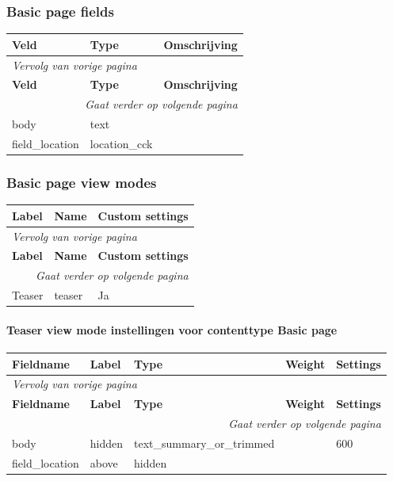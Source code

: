 \subsubsection{Basic page fields}
  \begin{longtable}{| p{5.00cm}|p{5.00cm}|p{5.00cm}|}
  \hline
  \rowcolor{tableheader}
  \textbf{Veld} & \textbf{Type} & \textbf{Omschrijving}  \tabularnewline
  \hline
\endfirsthead
\multicolumn{3}{l}{\textit{Vervolg van vorige pagina}} \\
\hline
\rowcolor{tableheader}
  \textbf{Veld} & \textbf{Type} & \textbf{Omschrijving}  \tabularnewline
  \hline
\hline
\endhead
\multicolumn{3}{r}{\textit{Gaat verder op volgende pagina}} \\
\endfoot
\hline
\endlastfoot
  body & text &   \tabularnewline
  \hline
  field\_location & location\_cck &   \tabularnewline
  \hline
  \end{longtable}

\subsubsection{Basic page view modes}
  \begin{longtable}{| p{5.00cm}|p{5.00cm}|p{5.00cm}|}
  \hline
  \rowcolor{tableheader}
  \textbf{Label} & \textbf{Name} & \textbf{Custom settings}  \tabularnewline
  \hline
\endfirsthead
\multicolumn{3}{l}{\textit{Vervolg van vorige pagina}} \\
\hline
\rowcolor{tableheader}
  \textbf{Label} & \textbf{Name} & \textbf{Custom settings}  \tabularnewline
  \hline
\hline
\endhead
\multicolumn{3}{r}{\textit{Gaat verder op volgende pagina}} \\
\endfoot
\hline
\endlastfoot
  Teaser & teaser & Ja  \tabularnewline
  \hline
  \end{longtable}

\paragraph{Teaser view mode instellingen voor contenttype Basic page }

  \begin{longtable}{| p{3.00cm}|p{3.00cm}|p{3.00cm}|p{3.00cm}|p{3.00cm}|}
  \hline
  \rowcolor{tableheader}
  \textbf{Fieldname} & \textbf{Label} & \textbf{Type} & \textbf{Weight} & \textbf{Settings}  \tabularnewline
  \hline
\endfirsthead
\multicolumn{5}{l}{\textit{Vervolg van vorige pagina}} \\
\hline
\rowcolor{tableheader}
  \textbf{Fieldname} & \textbf{Label} & \textbf{Type} & \textbf{Weight} & \textbf{Settings}  \tabularnewline
  \hline
\hline
\endhead
\multicolumn{5}{r}{\textit{Gaat verder op volgende pagina}} \\
\endfoot
\hline
\endlastfoot
  body & hidden & text\_summary\_or\_trimmed &   & 600  \tabularnewline
  \hline
  field\_location & above & hidden &   &    \tabularnewline
  \hline
  \end{longtable}


